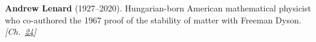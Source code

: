 \textbf{Andrew Lenard} (1927–2020). Hungarian-born American mathematical physicist who co-authored the 1967 proof of the stability of matter with Freeman Dyson. \emph{[Ch.~\hyperref[ch:4dspacetime]{24}]}

